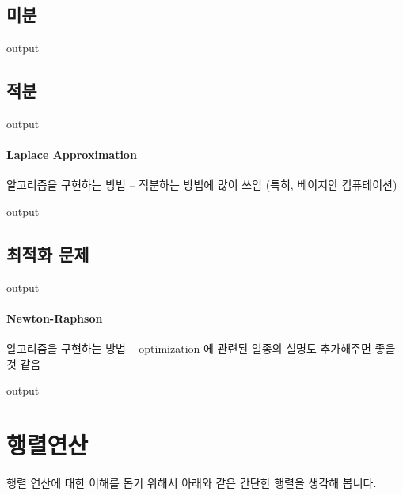 \documentclass{report}
\begin{document}
\subsection{미분}
\begin{Schunk}
\begin{Soutput}
output
\end{Soutput}
\end{Schunk}

\subsection{적분}
\begin{Schunk}
\begin{Soutput}
output
\end{Soutput}
\end{Schunk}
\paragraph{Laplace Approximation} 알고리즘을 구현하는 방법 -- 적분하는 방법에 많이 쓰임 (특히, 베이지안 컴퓨테이션) 
\begin{Schunk}
\begin{Soutput}
output
\end{Soutput}
\end{Schunk}

\subsection{최적화 문제}
\begin{Schunk}
\begin{Soutput}
output
\end{Soutput}
\end{Schunk}
\paragraph{Newton-Raphson} 알고리즘을 구현하는 방법 -- optimization 에 관련된 일종의 설명도 추가해주면 좋을 것 같음 
\begin{Schunk}
\begin{Soutput}
output
\end{Soutput}
\end{Schunk}


\section{행렬연산}

행렬 연산에 대한 이해를 돕기 위해서 아래와 같은 간단한 행렬을 생각해 봅니다. 
\end{document}
